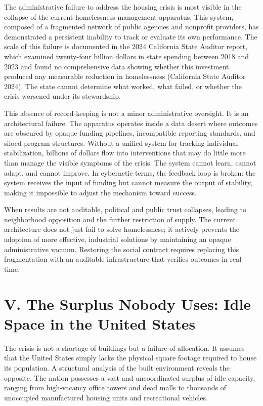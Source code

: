 \documentclass[
  12pt,
]{article}
\begin{document}
The administrative failure to address the housing crisis is most visible in the collapse of the current homelessness-management apparatus. This system, composed of a fragmented network of public agencies and nonprofit providers, has demonstrated a persistent inability to track or evaluate its own performance. The scale of this failure is documented in the 2024 California State Auditor report, which examined twenty-four billion dollars in state spending between 2018 and 2023 and found no comprehensive data showing whether this investment produced any measurable reduction in homelessness (California State Auditor 2024). The state cannot determine what worked, what failed, or whether the crisis worsened under its stewardship.

This absence of record-keeping is not a minor administrative oversight. It is an architectural failure. The apparatus operates inside a data desert where outcomes are obscured by opaque funding pipelines, incompatible reporting standards, and siloed program structures. Without a unified system for tracking individual stabilization, billions of dollars flow into interventions that may do little more than manage the visible symptoms of the crisis. The system cannot learn, cannot adapt, and cannot improve. In cybernetic terms, the feedback loop is broken: the system receives the input of funding but cannot measure the output of stability, making it impossible to adjust the mechanism toward success.

When results are not auditable, political and public trust collapses, leading to neighborhood opposition and the further restriction of supply. The current architecture does not just fail to solve homelessness; it actively prevents the adoption of more effective, industrial solutions by maintaining an opaque administrative vacuum. Restoring the social contract requires replacing this fragmentation with an auditable infrastructure that verifies outcomes in real time.

\hypertarget{v.-the-surplus-nobody-uses-idle-space-in-the-united-states}{%
\section{V. The Surplus Nobody Uses: Idle Space in the United States}\label{v.-the-surplus-nobody-uses-idle-space-in-the-united-states}}

The crisis is not a shortage of buildings but a failure of allocation. It assumes that the United States simply lacks the physical square footage required to house its population. A structural analysis of the built environment reveals the opposite. The nation possesses a vast and uncoordinated surplus of idle capacity, ranging from high-vacancy office towers and dead malls to thousands of unoccupied manufactured housing units and recreational vehicles.
\end{document}
